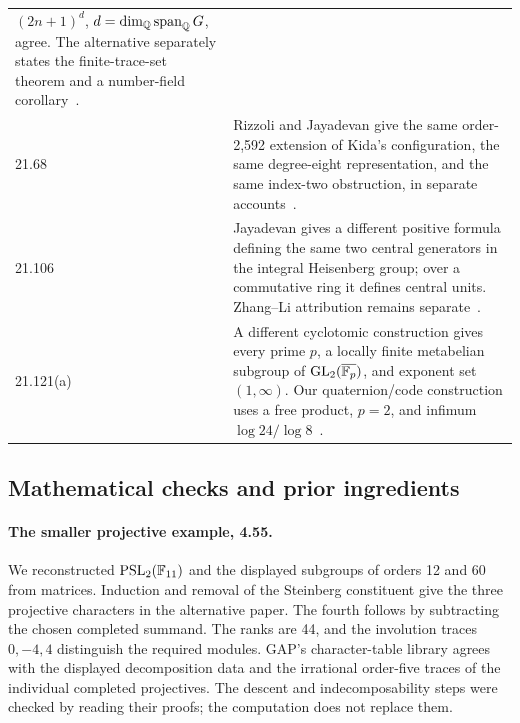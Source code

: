 \begin{longtable}{@{}p{}>{\raggedright\arraybackslash}p{}@{}}
\((2n+1)^d\), \(d=\dim_{\mathbb Q}\operatorname{span}_{\mathbb Q}G\), agree.
The alternative separately states the finite-trace-set theorem and a
number-field corollary~\cite{jayadevan-21-40}.\\[5pt]
21.68 & Rizzoli and Jayadevan give the same order-2,592 extension of
Kida's configuration, the same degree-eight representation, and the
same index-two obstruction, in separate accounts~\cite{rizzoli-21-68,jayadevan-21-68}.\\[5pt]
21.106 & Jayadevan gives a different positive formula defining the same
two central generators in the integral Heisenberg group; over a
commutative ring it defines central units. Zhang--Li attribution remains
separate~\cite{jayadevan-21-106,zhang-li-concise}.\\[5pt]
21.121(a) & A different cyclotomic construction gives every prime \(p\),
a locally finite metabelian subgroup of \(\operatorname{GL}_2(\overline{\mathbb F_p})\),
and exponent set \((1,\infty)\). Our quaternion/code construction
uses a free product, \(p=2\), and infimum
\(\log24/\log8\)~\cite{jayadevan-21-121a}.\\
\end{longtable}
\normalsize

\subsection{Mathematical checks and prior ingredients}

\paragraph{The smaller projective example, 4.55.}
We reconstructed \(\operatorname{PSL}_2(\mathbb F_{11})\) and the displayed
subgroups of orders 12 and 60 from matrices. Induction and removal of
the Steinberg constituent give the three projective characters in the
alternative paper. The fourth follows by subtracting the chosen
completed summand. The ranks are 44, and the involution traces
\(0,-4,4\) distinguish the required modules. GAP's character-table
library agrees with the displayed decomposition data and the irrational
order-five traces of the individual completed projectives. The descent
and indecomposability steps were checked by reading their proofs;
the computation does not replace them.

